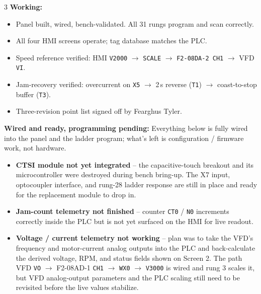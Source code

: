 \documentclass[ansiE, landscape]{sciposter}
\begin{document}
\begin{multicols}{3}
\textbf{Working:}
\begin{itemize}\setlength{\itemsep}{2pt}
  \item Panel built, wired, bench-validated. All 31 rungs program and scan correctly.
  \item All four HMI screens operate; tag database matches the PLC.
  \item Speed reference verified: HMI \texttt{V2000} $\rightarrow$ \texttt{SCALE} $\rightarrow$ \texttt{F2-08DA-2 CH1} $\rightarrow$ VFD \texttt{VI}.
  \item Jam-recovery verified: overcurrent on \texttt{X5} $\rightarrow$ 2\,s reverse (\texttt{T1}) $\rightarrow$ coast-to-stop buffer (\texttt{T3}).
  \item Three-revision point list signed off by Fearghus Tyler.
\end{itemize}
\textbf{Wired and ready, programming pending:}
Everything below is fully wired into the panel and the ladder
program; what's left is configuration / firmware work, not hardware.
\begin{itemize}\setlength{\itemsep}{2pt}
  \item \textbf{CTSI module not yet integrated} -- the capacitive-touch
        breakout and its microcontroller were destroyed during bench
        bring-up. The X7 input, optocoupler interface, and rung-28
        ladder response are still in place and ready for the replacement
        module to drop in.
  \item \textbf{Jam-count telemetry not finished} -- counter
        \texttt{CT0} / \texttt{N0} increments correctly inside the PLC
        but is not yet surfaced on the HMI for live readout.
  \item \textbf{Voltage / current telemetry not working} -- plan was
        to take the VFD's frequency and motor-current analog outputs
        into the PLC and back-calculate the derived voltage, RPM, and
        status fields shown on Screen 2. The path VFD \texttt{VO}
        $\rightarrow$ F2-08AD-1 \texttt{CH1} $\rightarrow$ \texttt{WX0}
        $\rightarrow$ \texttt{V3000} is wired and rung 3 scales it, but
        VFD analog-output parameters and the PLC scaling still need to
        be revisited before the live values stabilize.
\end{itemize}

\end{multicols}

\vspace{8pt}
\end{document}
